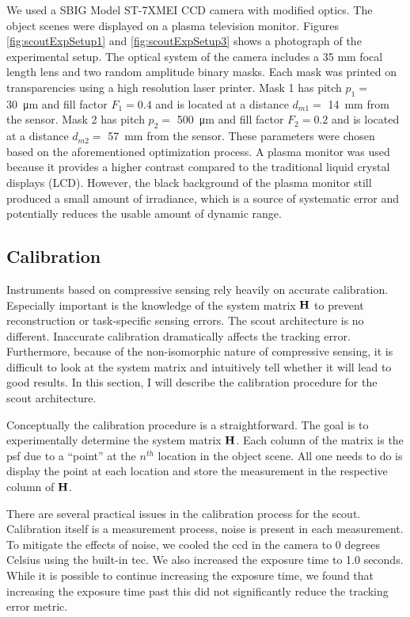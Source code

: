 We used a SBIG Model ST-7XMEI CCD camera with modified optics. The object scenes were displayed on a plasma television monitor. Figures \ref{fig:scoutExpSetup1} and \ref{fig:scoutExpSetup3} shows a photograph of the experimental setup. The optical system of the camera includes a 35 mm focal length lens and two random amplitude binary masks. Each mask was printed on transparencies using a high resolution laser printer. Mask 1 has pitch $p_1 = $ \SI{30}{\micro\metre}  and fill factor $F_1 = 0.4$ and is located at a distance $d_{m1} = $ \SI{14}{\milli\metre}  from the sensor. Mask 2 has pitch $p_2 = $ \SI{500}{\micro\metre} and fill factor $F_2 = 0.2$ and is located at a distance $d_{m2} = $ \SI{57}{\milli\metre} from the sensor. These parameters were chosen based on the aforementioned optimization process. A plasma monitor was used because it provides a higher contrast compared to the traditional liquid crystal displays (LCD). However, the black background of the plasma monitor still produced a small amount of irradiance, which is a source of systematic error and potentially reduces the usable amount of dynamic range. 
\subsection{Calibration}\label{ssec:ScoutCalibration}

Instruments based on compressive sensing rely heavily on accurate calibration. Especially important is the knowledge of the system matrix $\displaystyle \mathbf{H}$ to prevent reconstruction or task-specific sensing errors. The \gls{scout} architecture is no different. Inaccurate calibration dramatically affects the tracking error.  Furthermore, because of the non-isomorphic nature of compressive sensing, it is difficult to look at the system matrix and intuitively tell whether it will lead to good results. In this section, I will describe the calibration procedure for the \gls{scout} architecture. 

Conceptually the calibration procedure is a straightforward. The goal is to experimentally determine the system matrix $\displaystyle \mathbf{H}$. Each column of the matrix   is the \acrfull{psf} due to a ``point'' at the $n^{th}$ location in the object scene. All one needs to do is display the point at each location and store the measurement in the respective column of $\displaystyle \mathbf{H}$. 


There are several practical issues in the calibration process for the \gls{scout}. Calibration itself is a measurement process, noise is present in each measurement. To mitigate the effects of noise, we cooled the \gls{ccd} in the camera to $0$ degrees Celsius using the built-in \gls{tec}. We also increased the exposure time to 1.0 seconds. While it is possible to continue increasing the exposure time, we found that increasing the exposure time past this did not significantly reduce the tracking error metric.

